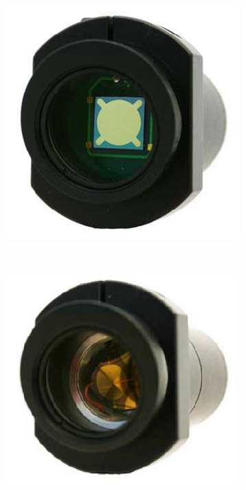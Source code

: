 \begin{figure}[!htbp]
	\centering
	\begin{subfigure}[c]{0.3\textwidth}
		\includegraphics[width=\textwidth]{./Img/boston-MEMS-MRR-INNER.jpg}
		\caption{}
		\label{fig:boston-MEMS-MRR-INNER.jpg}
	\end{subfigure}%
	~%
	\begin{subfigure}[c]{0.3\textwidth}
		\includegraphics[width=\textwidth]{./Img/boston-MEMS-MRR-outer.jpg}

\end{subfigure}
\end{figure}
